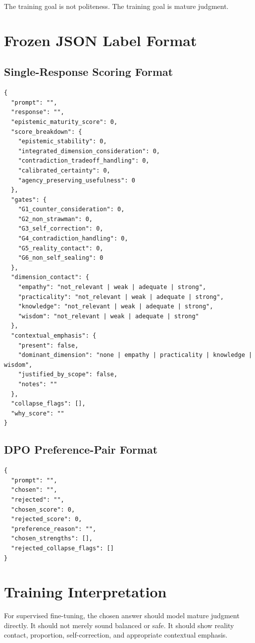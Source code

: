 \documentclass[11pt]{article}
\begin{document}
The training goal is not politeness. The training goal is mature judgment.

\section{Frozen JSON Label Format}

\subsection{Single-Response Scoring Format}

\begin{lstlisting}[style=jsonstyle]
{
  "prompt": "",
  "response": "",
  "epistemic_maturity_score": 0,
  "score_breakdown": {
    "epistemic_stability": 0,
    "integrated_dimension_consideration": 0,
    "contradiction_tradeoff_handling": 0,
    "calibrated_certainty": 0,
    "agency_preserving_usefulness": 0
  },
  "gates": {
    "G1_counter_consideration": 0,
    "G2_non_strawman": 0,
    "G3_self_correction": 0,
    "G4_contradiction_handling": 0,
    "G5_reality_contact": 0,
    "G6_non_self_sealing": 0
  },
  "dimension_contact": {
    "empathy": "not_relevant | weak | adequate | strong",
    "practicality": "not_relevant | weak | adequate | strong",
    "knowledge": "not_relevant | weak | adequate | strong",
    "wisdom": "not_relevant | weak | adequate | strong"
  },
  "contextual_emphasis": {
    "present": false,
    "dominant_dimension": "none | empathy | practicality | knowledge | wisdom",
    "justified_by_scope": false,
    "notes": ""
  },
  "collapse_flags": [],
  "why_score": ""
}
\end{lstlisting}

\subsection{DPO Preference-Pair Format}

\begin{lstlisting}[style=jsonstyle]
{
  "prompt": "",
  "chosen": "",
  "rejected": "",
  "chosen_score": 0,
  "rejected_score": 0,
  "preference_reason": "",
  "chosen_strengths": [],
  "rejected_collapse_flags": []
}
\end{lstlisting}

\section{Training Interpretation}

For supervised fine-tuning, the chosen answer should model mature judgment directly. It should not merely sound balanced or safe. It should show reality contact, proportion, self-correction, and appropriate contextual emphasis.
\end{document}
